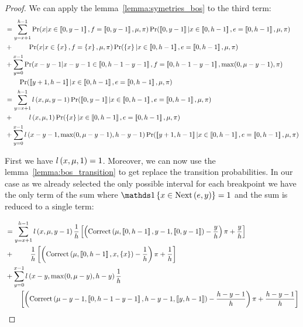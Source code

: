 \begin{proof}
We can apply the lemma~\ref{lemma:symetries_bos} to the third term:
\begin{align}
    &
    \begin{aligned}
        &=\sum_{y = x + 1}^{h - 1} \Pr(x | x \in \left\llbracket0, y - 1\right\rrbracket, f = \left\llbracket0, y - 1\right\rrbracket , \mu, \pi) \Pr(\left\llbracket0, y- 1\right\rrbracket | x \in \left\llbracket0, h - 1\right\rrbracket, e = \left\llbracket0, h - 1\right\rrbracket, \mu, \pi)\\
        &+\ \qquad \Pr(x | x \in \left\{ x \right\}, f = \left\{ x \right\}, \mu, \pi) \Pr(\left\{ x \right\} | x \in \left\llbracket0, h - 1\right\rrbracket, e = \left\llbracket0, h - 1\right\rrbracket, \mu, \pi)\\
        &+ \sum_{y =0}^{x - 1} \Pr(x - y - 1 | x - y - 1\in \left\llbracket0, h - 1 - y - 1\right\rrbracket, f = \left\llbracket0, h - 1 - y - 1\right\rrbracket, \max(0, \mu - y - 1), \pi) \\
        &\qquad \Pr(\left\llbracket y + 1, h - 1\right\rrbracket | x \in \left\llbracket0, h - 1\right\rrbracket, e = \left\llbracket0, h - 1\right\rrbracket, \mu, \pi)
    \end{aligned} \\
    &
    \begin{aligned}
        &=\sum_{y = x + 1}^{h - 1} \mathnormal{l}\left(x, \mu, y - 1\right) \Pr(\left\llbracket0, y-1\right\rrbracket | x \in \left\llbracket0, h - 1\right\rrbracket, e = \left\llbracket0, h - 1\right\rrbracket, \mu, \pi)\\
        &+\ \qquad \mathnormal{l}\left(x, \mu, 1\right) \Pr(\left\{ x \right\} | x \in \left\llbracket0, h - 1\right\rrbracket, e = \left\llbracket0, h - 1\right\rrbracket, \mu, \pi)\\
        &+ \sum_{y = 0}^{x - 1}\mathnormal{l}\left(x - y - 1, \max(0, \mu - y - 1), h - y - 1\right) \Pr(\left\llbracket y + 1, h - 1\right\rrbracket | x \in \left\llbracket0, h - 1\right\rrbracket, e = \left\llbracket0, h - 1\right\rrbracket, \mu, \pi)
    \end{aligned} \\
\end{align}

First we have $\mathnormal{l}\left(x, \mu, 1\right) = 1$.
Moreover, we can now use the lemma~\ref{lemma:bos_transition} to get replace the transition probabilities. In our case as we already selected the only possible interval for each breakpoint we have the only term of the sum where $\indickronecker{x \in \nextes{e}{y}} = 1$ and the sum is reduced to a single term:

\begin{align}
    \begin{aligned}
        &=\sum_{y = x + 1}^{h - 1} \mathnormal{l}\left(x, \mu, y - 1\right) \frac{1}{h} \left[ \left( \text{Correct}\left(\mu, \left\llbracket0, h - 1\right\rrbracket, y - 1, \left\llbracket0, y - 1\right\rrbracket\right) - \frac{y}{h} \right) \pi + \frac{y}{h} \right] \\
        &+\ \qquad \frac{1}{h} \left[ \left(\text{Correct}\left(\mu, \left\llbracket0, h - 1\right\rrbracket, x, \left\{ x \right\}\right) - \frac{1}{h} \right) \pi + \frac{1}{h} \right] \\
        &+ \sum_{y = 0}^{x - 1}\mathnormal{l}\left(x - y, \max(0, \mu - y), h - y\right) \frac{1}{h}  \\
        &\qquad \left[ \left( \text{Correct}\left(\mu - y - 1, \left\llbracket0, h - 1 - y - 1\right\rrbracket, h - y - 1, \left\llbracket y, h - 1\right\rrbracket\right) - \frac{h - y - 1}{h} \right) \pi + \frac{h - y - 1}{h} \right]
    \end{aligned} \\ 
\end{align}


\end{proof}

